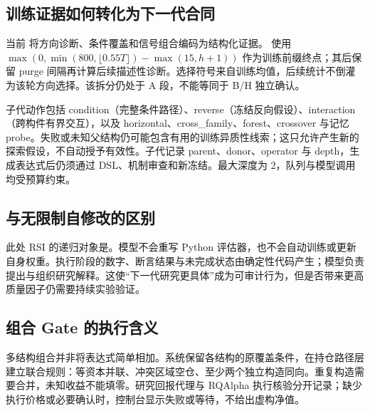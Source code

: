 \subsection{训练证据如何转化为下一代合同}
当前  将方向诊断、条件覆盖和信号组合编码为结构化证据。 使用 $\max(0,\min(800,\lfloor0.55T\rfloor)-\max(15,h+1))$ 作为训练前缀终点；其后保留 purge 间隔再计算后续描述性诊断。选择符号来自训练均值，后续统计不倒灌为该轮方向选择。该拆分仍处于 A 段，不能等同于 B/H 独立确认。

子代动作包括 condition（完整条件路径）、reverse（冻结反向假设）、interaction（跨构件有界交互），以及 horizontal、cross\_family、forest、crossover 与记忆 probe。失败或未知父结构仍可能包含有用的训练异质性线索；这只允许产生新的探索假设，不自动授予有效性。子代记录 parent、donor、operator 与 depth，生成表达式后仍须通过 DSL、机制审查和新冻结。最大深度为 2，队列与模型调用均受预算约束。

\subsection{与无限制自修改的区别}
此处 RSI 的递归对象是。模型不会重写 Python 评估器，也不会自动训练或更新自身权重。执行阶段的数字、断言结果与未完成状态由确定性代码产生；模型负责提出与组织研究解释。这使“下一代研究更具体”成为可审计行为，但是否带来更高质量因子仍需要持续实验验证。

\subsection{组合 Gate 的执行含义}
多结构组合并非将表达式简单相加。系统保留各结构的原覆盖条件，在持仓路径层建立联合规则：等资本并联、冲突区域空仓、至少两个独立构造同向。重复构造需要合并，未知收益不能填零。研究回报代理与 RQAlpha 执行核验分开记录；缺少执行价格或必要确认时，控制台显示失败或等待，不给出虚构净值。

